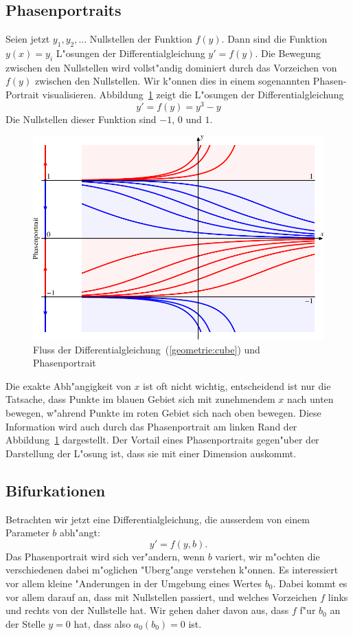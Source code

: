 \subsection{Phasenportraits}
Seien jetzt $y_1,y_2,\dots$ Nullstellen der Funktion $f(y)$.
Dann sind die Funktion $y(x)=y_i$ L"osungen der Differentialgleichung
$y'=f(y)$.
Die Bewegung zwischen den Nullstellen wird vollst"andig dominiert durch
das Vorzeichen von $f(y)$ zwischen den Nullstellen.
Wir k"onnen dies in einem sogenannten Phasen-Portrait visualisieren.
Abbildung~\ref{geometrie:phasenportrait} zeigt die L"osungen der
Differentialgleichung
\begin{equation}
y'=f(y)=y^3-y
\label{geometrie:cube}
\end{equation}
Die Nullstellen dieser Funktion sind $-1$, $0$ und $1$.
\begin{figure}
\centering
\includegraphics{chapters/images/geometrie-14.pdf}
\caption{Fluss der Differentialgleichung~(\ref{geometrie:cube}) und
Phasenportrait
\label{geometrie:phasenportrait}}
\end{figure}
Die exakte Abh"angigkeit von $x$ ist oft nicht wichtig, entscheidend
ist nur die Tatsache, dass Punkte im blauen Gebiet sich mit zunehmendem
$x$ nach unten bewegen, w"ahrend Punkte im roten Gebiet sich nach
oben bewegen.
Diese Information wird auch durch das Phasenportrait am linken
Rand der Abbildung~\ref{geometrie:phasenportrait} dargestellt.
Der Vortail eines Phasenportraits gegen"uber der Darstellung
der L"osung ist, dass sie mit einer Dimension auskommt.

%
%
\subsection{Bifurkationen}
Betrachten wir jetzt eine Differentialgleichung, die ausserdem von einem
Parameter $b$ abh"angt:
\[
y'=f(y,b).
\]
Das Phasenportrait wird sich ver"andern, wenn $b$ variert, wir
m"ochten die verschiedenen dabei m"oglichen "Uberg"ange verstehen
k"onnen.
Es interessiert vor allem kleine "Anderungen in der Umgebung eines
Wertes $b_0$.
Dabei kommt es vor allem darauf an, dass mit Nullstellen passiert, und
welches Vorzeichen $f$ links und rechts von der Nullstelle hat.
Wir gehen daher davon aus, dass $f$ f"ur $b_0$ an der Stelle $y=0$
hat, dass also $a_0(b_0)=0$ ist.

